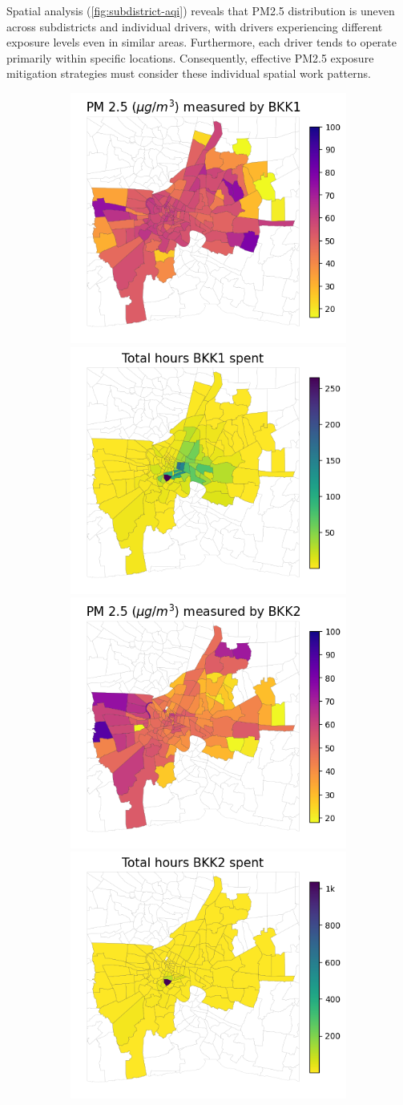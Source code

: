 \documentclass[sigconf,screen,natbib=true]{acmart}
\begin{document}
Spatial analysis (\autoref{fig:subdistrict-aqi}) reveals that PM2.5 distribution is uneven across subdistricts and individual drivers, with drivers experiencing different exposure levels even in similar areas.
Furthermore, each driver tends to operate primarily within specific locations.
Consequently, effective PM2.5 exposure mitigation strategies must consider these individual spatial work patterns.


\begin{figure}
    \centering
    \begin{subfigure}[t]{0.49\textwidth}
        \centering
        \includegraphics[width=.5\linewidth]{figures/map/BKK1_PM25.png}\includegraphics[width=.5\linewidth]{figures/map/BKK1_time.png}
        \includegraphics[width=.5\linewidth]{figures/map/BKK2_PM25.png}\includegraphics[width=.5\linewidth]{figures/map/BKK2_time.png}

\end{subfigure}
\end{figure}
\end{document}
